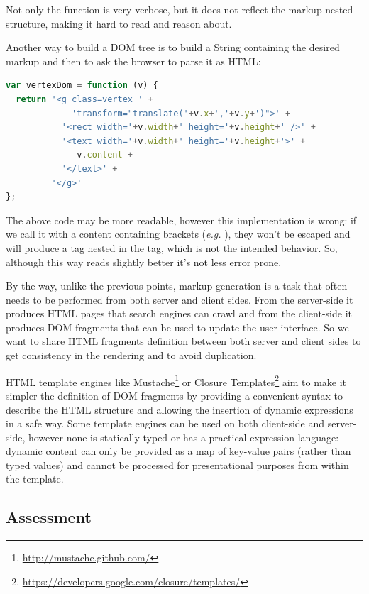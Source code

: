 \documentclass[american,english,runningheads]{llncs}
\newcommand{\eg}{\emph{e.g.}}
\begin{document}
Not only the  function is very verbose, but it does not reflect the markup nested structure, making
it hard to read and reason about.

Another way to build a DOM tree is to build a String containing the desired markup and then to ask the browser to
parse it as HTML:

\begin{lstlisting}[language=JavaScript]
var vertexDom = function (v) {
  return '<g class=vertex ' +
             'transform="translate('+v.x+','+v.y+')">' +
           '<rect width='+v.width+' height='+v.height+' />' +
           '<text width='+v.width+' height='+v.height+'>' +
              v.content +
           '</text>' +
         '</g>'
};
\end{lstlisting}

The above code may be more readable, however this implementation is wrong: if we call it with a content containing
brackets (\eg{} ), they won’t be escaped and will produce a  tag nested in the 
tag, which is not the intended behavior. So, although this way reads slightly better it’s not less error prone.

By the way, unlike the previous points, markup generation is a task that often needs to be performed from both server
and client sides. From the server-side it produces HTML pages that search engines can crawl and from the client-side
it produces DOM fragments that can be used to update the user interface. So we want to share HTML fragments definition
between both server and client sides to get consistency in the rendering and to avoid duplication.

HTML template engines like Mustache\footnote{\href{http://mustache.github.com/}{http://mustache.github.com/}} or
Closure Templates\footnote{\href{https://developers.google.com/closure/templates/}{https://developers.google.com/closure/templates/}}
aim to make it simpler the definition of DOM fragments by providing a convenient syntax to describe the HTML
structure and allowing the insertion of dynamic expressions in a safe way. Some template engines can be used on both
client-side and server-side, however none is statically typed or has a practical expression language: dynamic content
can only be provided as a map of key-value pairs (rather than typed values) and cannot be processed for
presentational purposes from within the template.

\subsection{Assessment}
\label{assessment}
\end{document}

